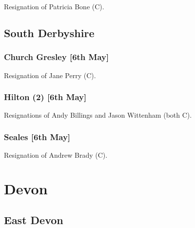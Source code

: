 \documentclass[a4paper,openany]{book}
\begin{document}
\begin{resultsiii}

Resignation of Patricia Bone (C).

\subsection*{South Derbyshire}

\subsubsection*{Church Gresley \hspace*{\fill}\nolinebreak[1]%
	\enspace\hspace*{\fill}
	[6th May]}


Resignation of Jane Perry (C).

\subsubsection*{Hilton (2) \hspace*{\fill}\nolinebreak[1]%
	\enspace\hspace*{\fill}
	[6th May]}


Resignations of Andy Billings and Jason Wittenham (both C).

\subsubsection*{Seales \hspace*{\fill}\nolinebreak[1]%
	\enspace\hspace*{\fill}
	[6th May]}


Resignation of Andrew Brady (C).

\section{Devon}

\subsection*{East Devon}


\end{resultsiii}
\end{document}
